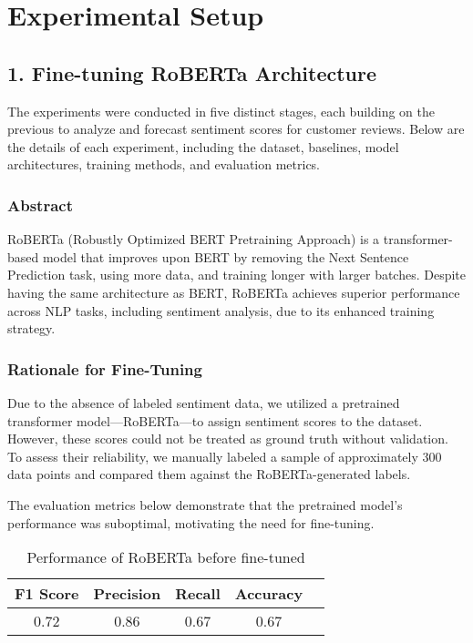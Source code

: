 \documentclass[letterpaper]{article}
\begin{document}
\section{Experimental Setup}
\subsection{1. Fine-tuning RoBERTa Architecture}
The experiments were conducted in five distinct stages, each building on the previous to analyze and forecast sentiment scores for customer reviews. Below are the details of each experiment, including the dataset, baselines, model architectures, training methods, and evaluation metrics.
\subsubsection{Abstract}
RoBERTa (Robustly Optimized BERT Pretraining Approach) is a transformer-based model that improves upon BERT by removing the Next Sentence Prediction task, using more data, and training longer with larger batches. Despite having the same architecture as BERT, RoBERTa achieves superior performance across NLP tasks, including sentiment analysis, due to its enhanced training strategy.

\subsubsection{Rationale for Fine-Tuning}

Due to the absence of labeled sentiment data, we utilized a pretrained transformer model—RoBERTa—to assign sentiment scores to the dataset. However, these scores could not be treated as ground truth without validation. To assess their reliability, we manually labeled a sample of approximately 300 data points and compared them against the RoBERTa-generated labels.

The evaluation metrics below demonstrate that the pretrained model's performance was suboptimal, motivating the need for fine-tuning.

\begin{table}[H]
    \centering
    \begin{tabular}{|c|c|c|c|c|}
        \hline
        \textbf{F1 Score} & \textbf{Precision} & \textbf{Recall} & \textbf{Accuracy} \\
        \hline
        0.72 & 0.86 & 0.67 & 0.67 \\
        \hline
    \end{tabular}
    \caption{Performance of RoBERTa before fine-tuned}
    \label{tab:Roberta_result}
    \vspace{1.5em}
\end{table}
\end{document}

